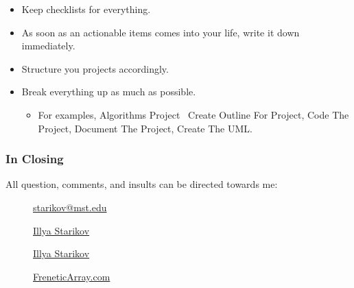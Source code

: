 \documentclass[xclolor=dvipsnames]{beamer}            %
\begin{document}
\begin{darkframes}
\begin{frame}
        \begin{itemize}
            \item Keep checklists for everything.
            \item As soon as an actionable items comes into your life, write it down immediately.
            \item Structure you projects accordingly.
            \item Break everything up as much as possible.
            \begin{itemize}
                \item For examples, Algorithms Project \textrightarrow\ Create Outline For Project, Code The Project, Document The Project, Create The UML.
            \end{itemize}
        \end{itemize}

    \end{frame}

    \begin{frame}
        \frametitle{In Closing}

        All question, comments, and insults can be directed towards me:

        \begin{center}
            \begin{description}
                \item[\faComment] \href{mailto:starikov@mst.edu}{starikov@mst.edu}
                \item[\faLinkedin] \href{https://www.linkedin.com/in/illyastarikov/}{Illya Starikov}
                \item[\faGithub] \href{https://github.com/IllyaStarikov/}{Illya Starikov}
                \item[\faRss] \href{https://freneticarray.com/}{FreneticArray.com}
            \end{description}
        \end{center}
    \end{frame}
\end{darkframes}
\end{document}

